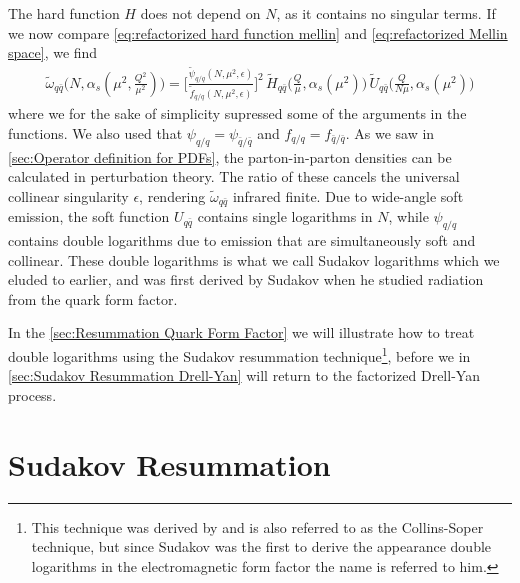 The hard function $H$ does not depend on $N$, as it contains no singular terms. If we now compare \cref{eq:refactorized hard function mellin} and \cref{eq:refactorized Mellin space}, we find
\begin{align}\label{eq:infrared safe hard scattering}
    \tilde{\omega}_{q\bar{q}}\Big(N,\alpha_{s}(\mu^{2},\frac{Q^{2}}{\mu^{2}})\Big)=\Big[\frac{\tilde{\psi}_{q/q}(N,\mu^{2},\epsilon)}{\tilde{f}_{q/q}(N,\mu^{2},\epsilon)}\Big]^{2}\,\tilde{H}_{q\bar{q}}\Big(\frac{Q}{\mu},\alpha_{s}(\mu^{2})\Big)\,\tilde{U}_{q\bar{q}}\Big(\frac{Q}{N\mu},\alpha_{s}(\mu^{2})\Big)
\end{align}
where we for the sake of simplicity supressed some of the arguments in the functions. We also used that $\psi_{q/q}=\psi_{\bar{q}/\bar{q}}$ and $f_{q/q}=f_{\bar{q}/\bar{q}}$. As we saw in \cref{sec:Operator definition for PDFs}, the parton-in-parton densities can be calculated in perturbation theory. The ratio of these cancels the universal collinear singularity $\epsilon$, rendering $\tilde{\omega}_{q\bar{q}}$ infrared finite. Due to wide-angle soft emission, the soft function $U_{q\bar{q}}$ contains single logarithms in $N$, while $\psi_{q/q}$ contains double logarithms due to emission that are simultaneously soft and collinear. These double logarithms is what we call Sudakov logarithms which we eluded to earlier, and was first derived by Sudakov when he studied radiation from the quark form factor.

In the \cref{sec:Resummation Quark Form Factor} we will illustrate how to treat double logarithms using the Sudakov resummation technique\footnote{This technique was derived by  and is also referred to as the Collins-Soper technique, but since Sudakov was the first to derive the appearance double logarithms in the electromagnetic form factor the name is referred to him.}, before we in \cref{sec:Sudakov Resummation Drell-Yan} will return to the factorized Drell-Yan process.

\section{Sudakov Resummation}
